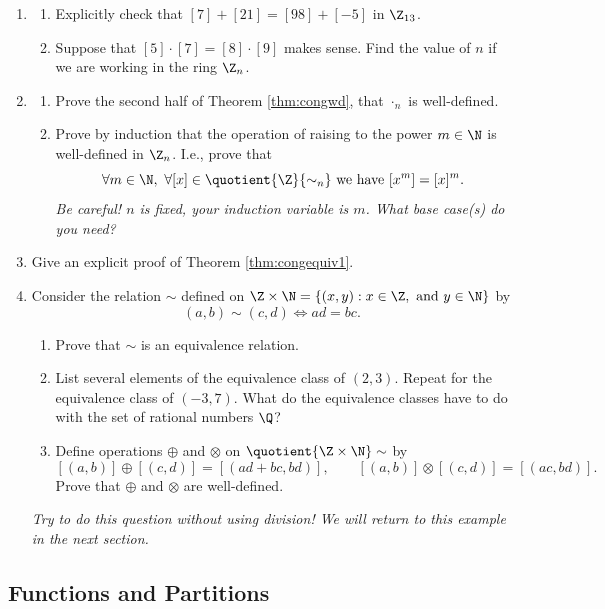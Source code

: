 \begin{enumerate}\renewcommand{\labelenumi}{\thesubsection.\theenumi}
  \item\begin{enumerate}
    \item Explicitly check that $[7]+[21]=[98]+[-5]$ in $\Z_{13}$.
    \item Suppose that $[5]\cdot[7]=[8]\cdot[9]$ makes sense. Find the value of $n$ if we are working in the ring $\Z_n$.
  \end{enumerate}\pagebreak[2]
  
  \item\begin{enumerate}
    \item Prove the second half of Theorem \ref{thm:congwd}, that $\cdot_n$ is well-defined.
	  \item Prove by induction that the operation of raising to the power $m\in\N$ is well-defined in $\Z_n$. I.e., prove that
  \[\forall m\in\N,\ \forall [x]\in\quotient{\Z}{\sim_n}\text{ we have } [x^m]=[x]^m.\]
  \emph{Be careful! $n$ is fixed, your induction variable is $m$. What base case(s) do you need?}
  \end{enumerate} 
  
  \item Give an explicit proof of Theorem \ref{thm:congequiv1}.
  
  \item\label{ex:qequiv} Consider the relation $\sim$ defined on $\Z\times\N=\{(x,y):x\in\Z,\text{ and }y\in\N\}$ by
  \[(a,b)\sim(c,d)\iff ad=bc.\]
  \begin{enumerate}
    \item Prove that $\sim$ is an equivalence relation.
    \item List several elements of the equivalence class of $(2,3)$. Repeat for the equivalence class of $(-3,7)$. What do the equivalence classes have to do with the set of rational numbers $\Q$?
    \item Define operations $\oplus$ and $\otimes$ on $\quotient{\Z\times\N}\sim$ by
    \[[(a,b)]\oplus[(c,d)]=[(ad+bc,bd)],\qquad [(a,b)]\otimes[(c,d)]=[(ac,bd)].\]
    Prove that $\oplus$ and $\otimes$ are well-defined.
  \end{enumerate}
  \emph{Try to do this question \emph{without} using division! We will return to this example in the next section.}
\end{enumerate}
\newpage

\subsection{Functions and Partitions}

